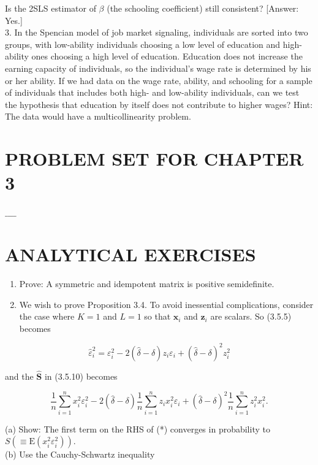 \documentclass[10pt]{article}
\begin{document}
Is the 2SLS estimator of $\beta$ (the schooling coefficient) still consistent? [Answer: Yes.]\\
3. In the Spencian model of job market signaling, individuals are sorted into two groups, with low-ability individuals choosing a low level of education and high-ability ones choosing a high level of education. Education does not increase the earning capacity of individuals, so the individual's wage rate is determined by his or her ability. If we had data on the wage rate, ability, and schooling for a sample of individuals that includes both high- and low-ability individuals, can we test the hypothesis that education by itself does not contribute to higher wages? Hint: The data would have a multicollinearity problem.

\section*{PROBLEM SET FOR CHAPTER 3}
$\_\_\_\_$

\section*{ANALYTICAL EXERCISES}
\begin{enumerate}
  \item Prove: A symmetric and idempotent matrix is positive semidefinite.
  \item We wish to prove Proposition 3.4. To avoid inessential complications, consider the case where $K=1$ and $L=1$ so that $\mathbf{x}_{i}$ and $\mathbf{z}_{i}$ are scalars. So (3.5.5) becomes
\end{enumerate}

$$
\hat{\varepsilon}_{i}^{2}=\varepsilon_{i}^{2}-2(\hat{\delta}-\delta) z_{i} \varepsilon_{i}+(\hat{\delta}-\delta)^{2} z_{i}^{2}
$$

and the $\widehat{\mathbf{S}}$ in (3.5.10) becomes


\begin{equation*}
\frac{1}{n} \sum_{i=1}^{n} x_{i}^{2} \varepsilon_{i}^{2}-2(\hat{\delta}-\delta) \frac{1}{n} \sum_{i=1}^{n} z_{i} x_{i}^{2} \varepsilon_{i}+(\hat{\delta}-\delta)^{2} \frac{1}{n} \sum_{i=1}^{n} z_{i}^{2} x_{i}^{2} . \tag{*}
\end{equation*}


(a) Show: The first term on the RHS of (*) converges in probability to $S \left(\equiv \mathrm{E}\left(x_{i}^{2} \varepsilon_{i}^{2}\right)\right)$.\\
(b) Use the Cauchy-Schwartz inequality
\end{document}
